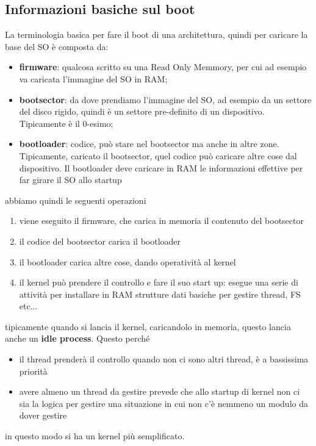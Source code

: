 \documentclass[12pt, oneside]{extbook}
\begin{document}
\subsection{Informazioni basiche sul boot}
La terminologia basica per fare il boot di una architettura, quindi per caricare la base del SO è composta da:
\begin{itemize}
\item \textbf{firmware}: qualcosa scritto su una Read Only Memmory, per cui ad esempio va caricata l'immagine del SO in RAM;
\item \textbf{bootsector}: da dove prendiamo l'immagine del SO, ad esempio da un settore del disco rigido, quindi è un settore pre-definito di un dispositivo. Tipicamente è il 0-esimo;
\item \textbf{bootloader}: codice, può stare nel bootsector ma anche in altre zone. Tipicamente, caricato il bootsector, quel codice può caricare altre cose dal dispositivo. Il bootloader deve caricare in RAM le informazioni effettive per far girare il SO allo startup
\end{itemize}
abbiamo quindi le seguenti operazioni
\begin{enumerate}
\item viene eseguito il firmware, che carica in memoria il contenuto del bootsector
\item il codice del bootsector carica il bootloader
\item il bootloader carica altre cose, dando operatività al kernel
\item il kernel può prendere il controllo e fare il suo start up: esegue una serie di attività per installare in RAM strutture dati basiche per gestire thread, FS etc...
\end{enumerate}
tipicamente quando si lancia il kernel, caricandolo in memoria, questo lancia anche un \textbf{idle process}. Questo perché 
\begin{itemize}
\item il thread prenderà il controllo quando non ci sono altri thread, è a bassissima priorità
\item avere almeno un thread da gestire prevede che allo startup di kernel non ci sia la logica per gestire una situazione in cui non c'è nemmeno un modulo da dover gestire
\end{itemize}
in questo modo si ha un kernel più semplificato.
\end{document}
